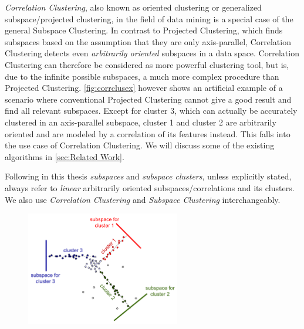 \textit{Correlation Clustering}, also known as oriented clustering or generalized subspace/projected clustering, in the field of data mining is a special case of the general Subspace Clustering. In contrast to Projected Clustering, which finds subspaces based on the assumption that they are only axis-parallel, Correlation Clustering detects even \textit{arbitrarily oriented} subspaces in a data space. Correlation Clustering can therefore be considered as more powerful clustering tool, but is, due to the infinite possible subspaces, a much more complex procedure than Projected Clustering. \autoref{fig:corrclusex} however shows an artificial example of a scenario where conventional Projected Clustering cannot give a good result and find all relevant subspaces. Except for cluster 3, which can actually be accurately clustered in an axis-parallel subspace, cluster 1 and cluster 2 are arbitrarily oriented and are modeled by a correlation of its features instead. This falls into the use case of Correlation Clustering. We will discuss some of the existing algorithms in \autoref{sec:Related Work}.


Following in this thesis \textit{subspaces} and \textit{subspace clusters}, unless explicitly stated, always refer to \textit{linear} arbitrarily oriented subspaces/correlations and its clusters. We also use \textit{Correlation Clustering} and \textit{Subspace Clustering} interchangeably.
\begin{figure}
    \centering
    \includegraphics[width=0.6\textwidth]{figures/subcluex.png}
    \caption{\cite[20]{zimek2009correlation}}
    \label{fig:corrclusex}
\end{figure}
